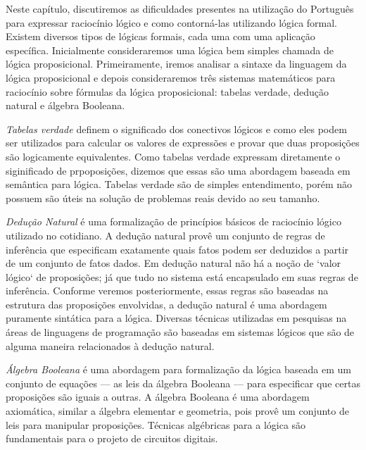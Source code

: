 Neste cap\'itulo, discutiremos as dificuldades presentes na utiliza\c{c}\~ao do Portugu\^es para expressar racioc\'inio 
l\'ogico e como contorn\'a-las utilizando l\'ogica formal. Existem diversos tipos de l\'ogicas formais, cada uma com 
uma aplica\c{c}\~ao espec\'ifica. Inicialmente consideraremos uma l\'ogica bem simples chamada de l\'ogica proposicional.
Primeiramente, iremos analisar a sintaxe da linguagem da l\'ogica proposicional e depois consideraremos tr\^es sistemas 
matem\'aticos para racioc\'inio sobre f\'ormulas da l\'ogica proposicional: tabelas verdade, dedu\c{c}\~ao natural e \'algebra 
Booleana.

\emph{Tabelas verdade} definem o significado dos conectivos l\'ogicos e como eles podem ser utilizados para calcular os 
valores de express\~oes e provar que duas proposi\c{c}\~oes s\~ao logicamente equivalentes. Como tabelas verdade
expressam diretamente o siginificado de prpoposi\c{c}\~oes, dizemos que essas s\~ao uma abordagem baseada em sem\^antica para l\'ogica.
Tabelas verdade s\~ao de simples entendimento, por\'em n\~ao possuem s\~ao \'uteis na solu\c{c}\~ao de problemas reais devido ao seu tamanho.

\emph{Dedu\c{c}\~ao Natural} \'e uma formaliza\c{c}\~ao de princ\'ipios b\'asicos de racioc\'inio l\'ogico utilizado no cotidiano.
A dedu\c{c}\~ao natural prov\^e um conjunto de regras de infer\^encia que especificam exatamente quais fatos podem ser deduzidos
a partir de um conjunto de fatos dados. Em dedu\c{c}\~ao natural n\~ao h\'a a no\c{c}\~ao de `valor l\'ogico` de proposi\c{c}\~oes;
j\'a que tudo no sistema est\'a encapsulado em suas regras de infer\^encia. Conforme veremos posteriormente, essas regras s\~ao baseadas
na estrutura das proposi\c{c}\~oes envolvidas, a dedu\c{c}\~ao natural \'e uma abordagem puramente sint\'atica para a l\'ogica. Diversas
t\'ecnicas utilizadas em pesquisas na \'areas de linguagens de programa\c{c}\~ao s\~ao baseadas em sistemas l\'ogicos que s\~ao de alguma
maneira relacionados \`a dedu\c{c}\~ao natural.

\emph{\'Algebra Booleana} \'e uma abordagem para formaliza\c{c}\~ao da l\'ogica baseada em um conjunto de equa\c{c}\~oes --- as leis
da \'algebra Booleana --- para especificar que certas proposi\c{c}\~oes s\~ao iguais a outras. A \'algebra Booleana \'e uma abordagem
axiom\'atica, similar a \'algebra elementar e geometria, pois prov\^e um conjunto de leis para manipular proposi\c{c}\~oes. T\'ecnicas
alg\'ebricas para a l\'ogica s\~ao fundamentais para o projeto de circuitos digitais.

